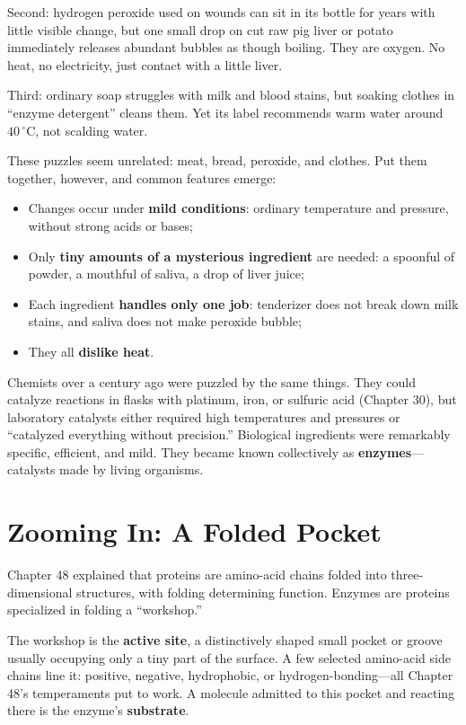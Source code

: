 Second: hydrogen peroxide used on wounds can sit in its bottle for years with little visible change, but one small drop on cut raw pig liver or potato immediately releases abundant bubbles as though boiling. They are oxygen. No heat, no electricity, just contact with a little liver.

Third: ordinary soap struggles with milk and blood stains, but soaking clothes in ``enzyme detergent'' cleans them. Yet its label recommends warm water around $40\,^{\circ}\mathrm{C}$, not scalding water.

These puzzles seem unrelated: meat, bread, peroxide, and clothes. Put them together, however, and common features emerge:

\begin{itemize}[itemsep=2pt]
\item Changes occur under \textbf{mild conditions}: ordinary temperature and pressure, without strong acids or bases;
\item Only \textbf{tiny amounts of a mysterious ingredient} are needed: a spoonful of powder, a mouthful of saliva, a drop of liver juice;
\item Each ingredient \textbf{handles only one job}: tenderizer does not break down milk stains, and saliva does not make peroxide bubble;
\item They all \textbf{dislike heat}.
\end{itemize}

Chemists over a century ago were puzzled by the same things. They could catalyze reactions in flasks with platinum, iron, or sulfuric acid (Chapter 30), but laboratory catalysts either required high temperatures and pressures or ``catalyzed everything without precision.'' Biological ingredients were remarkably specific, efficient, and mild. They became known collectively as \textbf{enzymes}---catalysts made by living organisms.

\section{Zooming In: A Folded Pocket}

Chapter 48 explained that proteins are amino-acid chains folded into three-dimensional structures, with folding determining function. Enzymes are proteins specialized in folding a ``workshop.''

The workshop is the \textbf{active site}, a distinctively shaped small pocket or groove usually occupying only a tiny part of the surface. A few selected amino-acid side chains line it: positive, negative, hydrophobic, or hydrogen-bonding---all Chapter 48's temperaments put to work. A molecule admitted to this pocket and reacting there is the enzyme's \textbf{substrate}.

